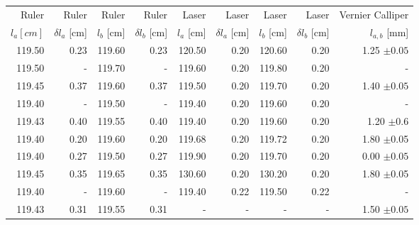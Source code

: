 \begin{tabular}{rrrrrrrrr}
\hline
Ruler & Ruler & Ruler & Ruler & Laser & Laser & Laser & Laser & Vernier Calliper \\
   $l_a [cm]$ &  $\delta l_a$ [cm] &   $l_b$ [cm] &   $\delta l_b$ [cm] &   $l_a$ [cm] &   $\delta l_a$ [cm] & $l_b$ [cm] &   $\delta l_b$ [cm] & $l_{a, b}$ [mm] \\
\hline
           119.50 &              0.23 &           119.60 &              0.23 &           120.50 &              0.20 &           120.60 &              0.20 &                         1.25 $\pm 0.05$ \\
           119.50 &              - &           119.70 &              - &           119.60 &              0.20 &           119.80 &              0.20 &                         - \\
           119.45 &              0.37 &           119.60 &              0.37 &           119.50 &              0.20 &           119.70 &              0.20 &                         1.40 $\pm 0.05$\\
           119.40 &              - &           119.50 &              - &           119.40 &              0.20 &           119.60 &              0.20 &                         - \\
           119.43 &              0.40 &           119.55 &              0.40 &           119.40 &              0.20 &           119.60 &              0.20 &                         1.20 $\pm $0.6\\
           119.40 &              0.20 &           119.60 &              0.20 &           119.68 &              0.20 &           119.72 &              0.20 &                         1.80 $\pm $0.05\\
           119.40 &              0.27 &           119.50 &              0.27 &           119.90 &              0.20 &           119.70 &              0.20 &                         0.00 $\pm 0.05$\\
           119.45 &              0.35 &           119.65 &              0.35 &           130.60 &              0.20 &           130.20 &              0.20 &                         1.80 $\pm $0.05\\
           119.40 &              - &           119.60 &              - &           119.40 &              0.22 &           119.50 &              0.22 &                         - \\
           119.43 &              0.31 &           119.55 &              0.31 &             - &              - &             - &              - &                         1.50 $\pm 0.05$\\
\hline
\end{tabular}
